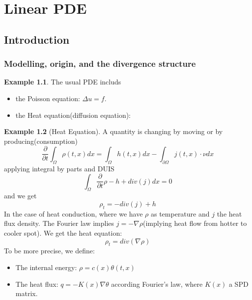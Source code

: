 \documentclass[a4paper,11pt,oneside,fleqn]{book}
\theoremstyle{definition}
\newtheorem*{example}{Example}
\theoremstyle{remark}
\begin{document}
\chapter{Linear PDE}
\section{Introduction}
\subsection{Modelling, origin, and the divergence structure}

\begin{example}
The usual PDE includs
\begin{itemize}
	\item the Poisson equation: $\Delta u = f$. 
	\item the Heat equation(diffusion equation): 
\end{itemize}	
\end{example}

\begin{example}[Heat Equation]
A quantity is changing by moving or by producing(consumption)
\begin{equation*}
	\frac{\partial}{\partial t} \int_\Omega \rho(t, x) dx = \int_\Omega h(t, x) dx  - \int_{\partial \Omega} j(t, x) \cdot \nu dx 
\end{equation*}
applying integral by parts and DUIS
\begin{equation*}
	\int_\Omega \frac{\partial}{\partial t} \rho - h + div(j) dx =0
\end{equation*}
and we get
\begin{equation*}
	\rho_t = -div(j) +h
\end{equation*}
In the case of heat conduction, where we have $\rho$ as temperature and $ j$ the heat flux density. The Fourier law implies $j = -\nabla \rho$(implying heat flow from hotter to cooler spot). We get the heat equation:
\begin{equation}
	\rho_t = div(\nabla \rho)
\end{equation}
To be more precise, we define:
\begin{itemize}
	\item The internal energy: $\rho = c(x)\theta(t, x)$
	\item The heat flux:  $ q = -K(x)\nabla \theta $ according Fourier's law, where $K(x)$ a SPD matrix.
\end{itemize}
\end{example}
\end{document}
